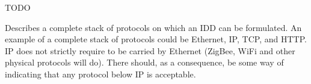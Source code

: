 %
%

TODO

Describes a complete stack of protocols on which an IDD can be formulated.
An example of a complete stack of protocols could be Ethernet, IP, TCP, and HTTP.
IP does not strictly require to be carried by Ethernet (ZigBee, WiFi and other physical protocols will do).
There should, as a consequence, be some way of indicating that any protocol below IP is acceptable.